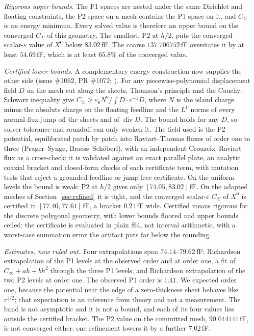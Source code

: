 \documentclass{anvil-paper}
\begin{document}
\emph{Rigorous upper bounds.} The P1 spaces are nested under the same
Dirichlet and floating constraints, the P2 space on a mesh contains the
P1 space on it, and $C_\Sigma$ is an energy minimum. Every solved value
is therefore an upper bound on the converged $C_\Sigma$ of this
geometry. The smallest, P2 at $h/2$, puts the converged
scalar-$\varepsilon$ value of $X^0$ below $83.02$\,fF. The coarse
$137.706752$\,fF overstates it by at least $54.69$\,fF, which is at
least $65.8\%$ of the converged value.

\emph{Certified lower bounds.} A complementary-energy construction now
supplies the other side (issue \#1062, PR \#1072;
). For any
piecewise-polynomial displacement field $D$ on the mesh cut along the
sheets, Thomson's principle and the Cauchy--Schwarz inequality give
$C_\Sigma \geq \varepsilon_0 N^2 / \int D\cdot\varepsilon^{-1}D$, where
$N$ is the island charge minus the absolute charge on the floating
feedline and the $L^1$ norms of every normal-flux jump off the sheets
and of $\operatorname{div} D$. The bound holds for any $D$, so solver
tolerance and roundoff can only weaken it. The field used is the P2
potential, equilibrated patch by patch into Raviart--Thomas fluxes of
order one to three (Prager--Synge, Braess--Sch\"oberl), with an
independent Crouzeix--Raviart flux as a cross-check; it is validated
against an exact parallel plate, an analytic coaxial bracket and
closed-form checks of each certificate term, with mutation tests that
reject a grounded-feedline or jump-free certificate. On the uniform
levels the bound is weak: P2 at $h/2$ gives only $[74.05, 83.02]$\,fF.
On the adapted meshes of Section~\ref{sec:refined} it is tight, and the
converged scalar-$\varepsilon$ $C_\Sigma$ of $X^0$ is certified in
$[77.40, 77.61]$\,fF, a bracket $0.21$\,fF wide. Certified means
rigorous for the discrete polygonal geometry, with lower bounds floored
and upper bounds ceiled; the certificate is evaluated in plain f64, not
interval arithmetic, with a worst-case summation error the artifact puts
far below the rounding.

\emph{Estimates, now ruled out.} Four extrapolations span
$74.14$--$79.62$\,fF: Richardson extrapolation of the P1 levels at the
observed order and at order one, a fit of $C_\infty + a h + b h^2$
through the three P1 levels, and Richardson extrapolation of the two P2
levels at order one. The observed P1 order is $1.41$. We expected order
one, because the potential near the edge of a zero-thickness sheet
behaves like $r^{1/2}$; that expectation is an inference from theory
and not a measurement. The band is not asymptotic and it is not a
bound, and each of its four values lies outside the certified bracket.
The P2 value on the committed mesh, $90.044141$\,fF, is not converged
either: one refinement lowers it by a further $7.02$\,fF.
\end{document}

